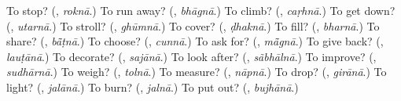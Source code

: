 \begin{tcolorbox}[breakable,colback=teal!4,colframe=teal!35!black,title={Before you move on}]
To stop? (\textbf{}, \emph{roknā}.) To run away? (\textbf{}, \emph{bhāgnā}.) To climb? (\textbf{}, \emph{caṛhnā}.) To get down? (\textbf{}, \emph{utarnā}.) To stroll? (\textbf{}, \emph{ghūmnā}.) To cover? (\textbf{}, \emph{ḍhaknā}.) To fill? (\textbf{}, \emph{bharnā}.) To share? (\textbf{}, \emph{bā̃ṭnā}.) To choose? (\textbf{}, \emph{cunnā}.) To ask for? (\textbf{}, \emph{mā̃gnā}.) To give back? (\textbf{}, \emph{lauṭānā}.) To decorate? (\textbf{}, \emph{sajānā}.) To look after? (\textbf{}, \emph{sãbhālnā}.) To improve? (\textbf{}, \emph{sudhārnā}.) To weigh? (\textbf{}, \emph{tolnā}.) To measure? (\textbf{}, \emph{nāpnā}.) To drop? (\textbf{}, \emph{girānā}.) To light? (\textbf{}, \emph{jalānā}.) To burn? (\textbf{}, \emph{jalnā}.) To put out? (\textbf{}, \emph{bujhānā}.)
\end{tcolorbox}
